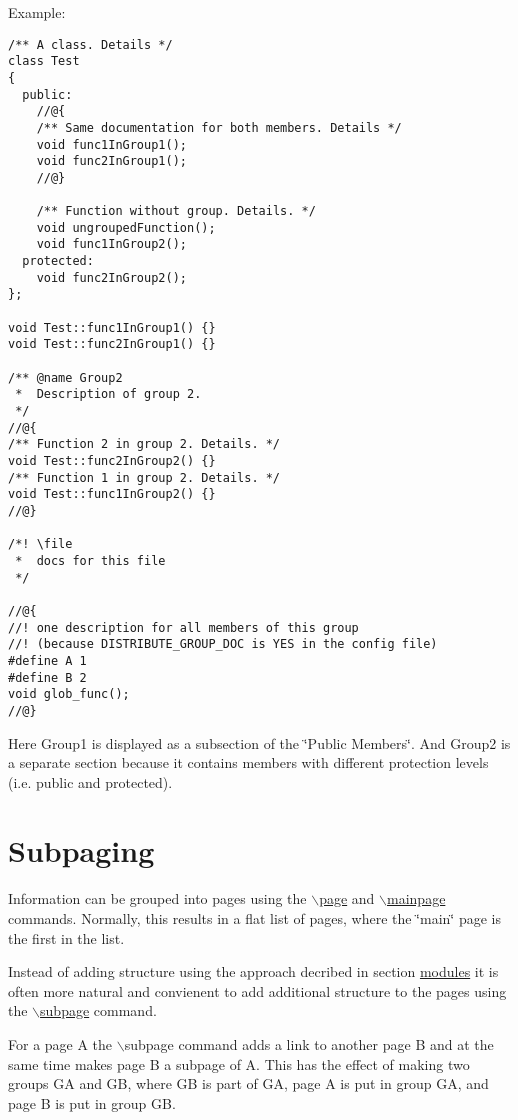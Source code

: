 \begin{Desc}
\item[Example:]

\begin{VerbInclude}\begin{verbatim}/** A class. Details */
class Test
{
  public:
    //@{
    /** Same documentation for both members. Details */
    void func1InGroup1();
    void func2InGroup1();
    //@}

    /** Function without group. Details. */
    void ungroupedFunction();
    void func1InGroup2();
  protected:
    void func2InGroup2();
};

void Test::func1InGroup1() {}
void Test::func2InGroup1() {}

/** @name Group2
 *  Description of group 2. 
 */
//@{
/** Function 2 in group 2. Details. */
void Test::func2InGroup2() {}
/** Function 1 in group 2. Details. */
void Test::func1InGroup2() {}
//@}

/*! \file 
 *  docs for this file
 */

//@{
//! one description for all members of this group 
//! (because DISTRIBUTE_GROUP_DOC is YES in the config file)
#define A 1
#define B 2
void glob_func();
//@}
\end{verbatim}
\end{VerbInclude}
\end{Desc}


Here Group1 is displayed as a subsection of the \char`\"{}Public Members\char`\"{}. And Group2 is a separate section because it contains members with different protection levels (i.e. public and protected).

\hypertarget{grouping_subpaging}{}\section{Subpaging}\label{grouping_subpaging}
Information can be grouped into pages using the \hyperlink{commands_cmdpage}{$\backslash$page} and \hyperlink{commands_cmdsubpage}{$\backslash$mainpage} commands. Normally, this results in a flat list of pages, where the \char`\"{}main\char`\"{} page is the first in the list.

Instead of adding structure using the approach decribed in section \hyperlink{grouping_modules}{modules} it is often more natural and convienent to add additional structure to the pages using the \hyperlink{commands_cmdsubpage}{$\backslash$subpage} command.

For a page A the $\backslash$subpage command adds a link to another page B and at the same time makes page B a subpage of A. This has the effect of making two groups GA and GB, where GB is part of GA, page A is put in group GA, and page B is put in group GB.

 